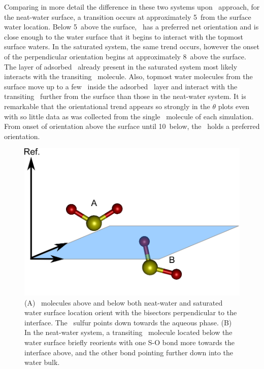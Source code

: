 \documentclass{article}
\begin{document}
  Comparing in more detail the difference in these two systems upon \suldiox~approach, for the neat-water surface, a transition occurs at approximately 5\angs~from the surface water location. Below 5\angs~above the surface, \suldiox~has a preferred net orientation and is close enough to the water surface that it begins to interact with the topmost surface waters. In the saturated system, the same trend occurs, however the onset of the perpendicular orientation begins at approximately 8\angs~above the surface. The layer of adsorbed \suldiox~already present in the saturated system most likely interacts with the transiting \suldiox~molecule. Also, topmost water molecules from the surface move up to a few \angs~inside the adsorbed \suldiox~layer and interact with the transiting \suldiox~further from the surface than those in the neat-water system. It is remarkable that the orientational trend appears so strongly in the $\theta$ plots even with so little data as was collected from the single \suldiox~molecule of each simulation. From onset of orientation above the surface until 10\angs~below, the \suldiox~holds a preferred orientation.

\begin{figure}[h!]
	\begin{center}
		\includegraphics[scale=1.0]{images/so2-surface.png}
		\caption{(A) \suldiox~molecules above and below both neat-water and saturated water surface location orient with the bisectors perpendicular to the interface. The \suldiox~sulfur points down towards the aqueous phase. (B) In the neat-water system, a transiting \suldiox~molecule located below the water surface briefly reorients with one S-O bond more towards the interface above, and the other bond pointing further down into the water bulk.}
		\label{fig:so2-surface-angles}
	\end{center}
\end{figure}
\end{document}
